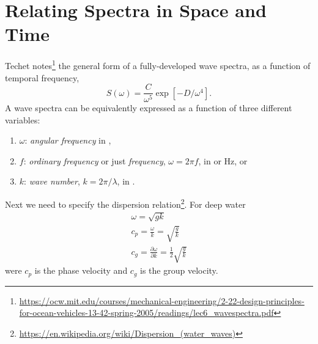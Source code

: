 \documentclass[11pt]{article}
\begin{document}
\section{Relating Spectra in Space and Time}
Techet notes\footnote{\url{https://ocw.mit.edu/courses/mechanical-engineering/2-22-design-principles-for-ocean-vehicles-13-42-spring-2005/readings/lec6_wavespectra.pdf}} the general form of a fully-developed wave spectra, as a function of temporal frequency,
\begin{equation}
S(\omega) = \frac{C}{\omega^5} \exp{\left[ -D/\omega^4 \right]}.
\label{e:form}
\end{equation}
A wave spectra can be equivalently expressed as a function of three different variables:
\begin{enumerate}
\item $\omega$: \emph{angular frequency} in ,
\item $f$: \emph{ordinary frequency} or just \emph{frequency}, $\omega=2 \pi f$, in  or \unit[]{Hz}, or
\item $k$: \emph{wave number}, $k = 2 \pi/\lambda$, in .
\end{enumerate}


Next we need to specify the dispersion relation\footnote{\url{https://en.wikipedia.org/wiki/Dispersion_(water_waves)}}.  For deep water 
\begin{eqnarray}
\omega = \sqrt{gk} \\
c_p = \frac{\omega}{k}=\sqrt{\frac{g}{k}} \\
c_g = \frac{\partial \omega}{\partial k} = \frac{1}{2} \sqrt{\frac{g}{k}}
\end{eqnarray}
were $c_p$ is the phase velocity and $c_g$ is the group velocity.
\end{document}
